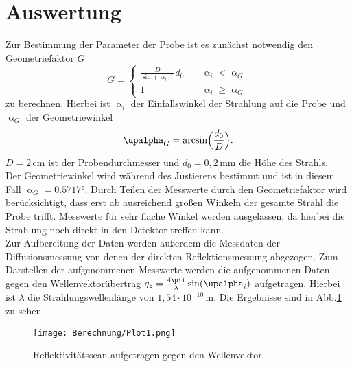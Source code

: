 \section{Auswertung}
Zur Bestimmung der Parameter der Probe ist es zunächst notwendig den Geometriefaktor $G$
\begin{equation}
  G =
     \begin{cases}
       \frac{D}{\sin\left(\upalpha_i\right)}{d_0} &\quad\upalpha_i<\upalpha_G\\
       1 &\quad\upalpha_i\geq\upalpha_G
     \end{cases}
\end{equation}
zu berechnen. Hierbei ist $\upalpha_i$ der Einfallswinkel der Strahlung auf die Probe und $\upalpha_G$ der Geometriewinkel
\begin{equation}
\upalpha_G=\arcsin\Bigl(\frac{d_0}{D}\Bigr).
\end{equation}
$D=2\,\si{\cm}$ ist der Probendurchmesser und $d_0=0{,}2\,\si{\mm}$ die Höhe des Strahls.\\
 Der Geometriewinkel wird während des Justierens bestimmt und ist in diesem Fall $\upalpha_G=0.5717°$.
Durch Teilen der Messwerte durch den Geometriefaktor wird berücksichtigt, dass erst ab ausreichend großen Winkeln der gesamte Strahl die Probe trifft. Messwerte für sehr flache Winkel werden ausgelassen, da hierbei die Strahlung noch direkt in den Detektor treffen kann.\\
Zur Aufbereitung der Daten werden außerdem die Messdaten der Diffusionsmessung von denen der direkten Reflektionsmessung abgezogen. Zum Darstellen der aufgenommenen Messwerte werden die aufgenommenen Daten gegen den Wellenvektorübertrag $q_z=\frac{4\pii}{\lambda}\sin(\upalpha_i)$ aufgetragen. Hierbei ist $\lambda$ die Strahlungswellenlänge von $1{,}54\cdot10^{-10}\,\si{\m}$. Die Ergebnisse sind in Abb.\ref{Plot1} zu sehen.
\begin{figure}[H]
  \centering
  \texttt{[image: Berechnung/Plot1.png]}
  \caption{Reflektivitätsscan aufgetragen gegen den Wellenvektor.}
  \label{Plot1}
\end{figure}

